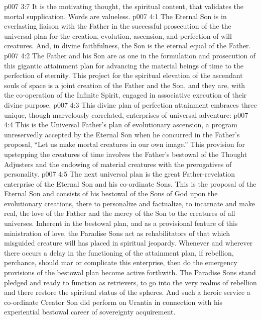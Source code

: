 \vs p007 3:7 It is the motivating thought, the spiritual content, that validates the mortal supplication. Words are valueless.
\vs p007 4:1 The Eternal Son is in everlasting liaison with the Father in the successful prosecution of the  the universal plan for the creation, evolution, ascension, and perfection of will creatures. And, in divine faithfulness, the Son is the eternal equal of the Father.
\vs p007 4:2 The Father and his Son are as one in the formulation and prosecution of this gigantic attainment plan for advancing the material beings of time to the perfection of eternity. This project for the spiritual elevation of the ascendant souls of space is a joint creation of the Father and the Son, and they are, with the co\hyp{}operation of the Infinite Spirit, engaged in associative execution of their divine purpose.
\pc \vs p007 4:3 This divine plan of perfection attainment embraces three unique, though marvelously correlated, enterprises of universal adventure:
\pc \vs p007 4:4 \bibnobreakspace {} This is the Universal Father’s plan of evolutionary ascension, a program unreservedly accepted by the Eternal Son when he concurred in the Father’s proposal, “Let us make mortal creatures in our own image.” This provision for upstepping the creatures of time involves the Father’s bestowal of the Thought Adjusters and the endowing of material creatures with the prerogatives of personality.
\pc \vs p007 4:5 \bibnobreakspace {} The next universal plan is the great Father\hyp{}revelation enterprise of the Eternal Son and his co\hyp{}ordinate Sons. This is the proposal of the Eternal Son and consists of his bestowal of the Sons of God upon the evolutionary creations, there to personalize and factualize, to incarnate and make real, the love of the Father and the mercy of the Son to the creatures of all universes. Inherent in the bestowal plan, and as a provisional feature of this ministration of love, the Paradise Sons act as rehabilitators of that which misguided creature will has placed in spiritual jeopardy. Whenever and wherever there occurs a delay in the functioning of the attainment plan, if rebellion, perchance, should mar or complicate this enterprise, then do the emergency provisions of the bestowal plan become active forthwith. The Paradise Sons stand pledged and ready to function as retrievers, to go into the very realms of rebellion and there restore the spiritual status of the spheres. And such a heroic service a co\hyp{}ordinate Creator Son did perform on Urantia in connection with his experiential bestowal career of sovereignty acquirement.
